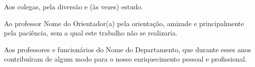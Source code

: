 \begin{agradecimento}
Aos colegas, pela diversão e (às vezes) estudo.

Ao professor Nome do Orientador(a) pela orientação, amizade e
principalmente pela paciência, sem a qual este trabalho não se
realizaria.

Aos professores e funcionários do Nome do Departamento, que durante esses anos 
contribuíram de algum modo para o nosso enriquecimento pessoal e
profissional.
\end{agradecimento}